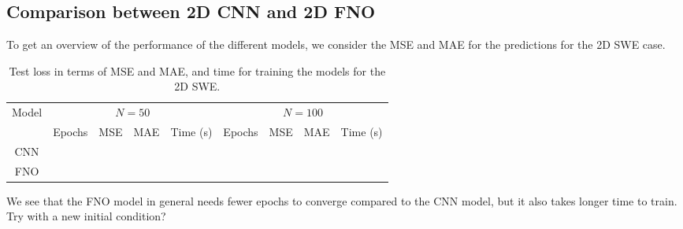 \subsection{Comparison between 2D CNN and 2D FNO}


To get an overview of the performance of the different models, we consider the MSE and MAE for the predictions for the 2D SWE case.
\begin{table}[H]
    \centering
    \small %
    \begin{tabular}{c|cccc|cccc}
        Model & \multicolumn{4}{c|}{$N = 50$} & \multicolumn{4}{c}{$N = 100$} \\
        \cline{2-9}
        & Epochs & MSE & MAE & Time (s) & Epochs & MSE & MAE & Time (s) \\
        \hline
        CNN  &
         &
         & 
         &
         &
         &
         &
         &
         
        \\
        \hline
        FNO  &
         &
         &
         &
         &
         &
         &
         &
        
        \\
        \hline
    \end{tabular}
    \caption{Test loss in terms of MSE and MAE, and time for training the models for the 2D SWE.}\label{tab:results_2D_comparison}
\end{table}

We see that the FNO model in general needs fewer epochs to converge compared to the CNN model, but it also takes longer time to train.
Try with a new initial condition? 


